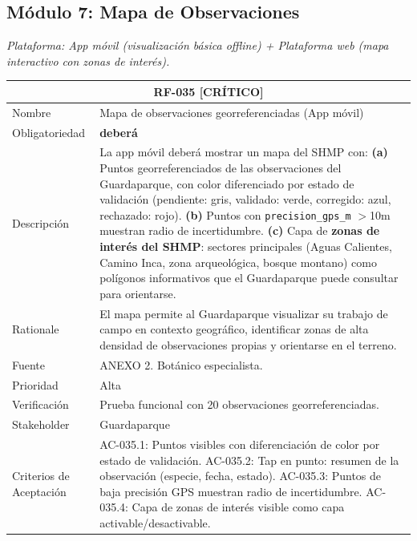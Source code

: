 \documentclass[12pt, a4paper]{article}
\newcommand{\criticomark}{\textcolor{criticolor}{\textbf{[CR\'ITICO]}}}
\begin{document}
\subsection{M\'odulo 7: Mapa de Observaciones}

\textit{Plataforma: App m\'ovil (visualizaci\'on b\'asica offline) + Plataforma web (mapa interactivo con zonas de inter\'es).}

\begin{longtable}{|p{3cm}|p{11.5cm}|}
\hline
\multicolumn{2}{|c|}{\textbf{RF-035} \criticomark} \\
\hline
Nombre & Mapa de observaciones georreferenciadas (App m\'ovil) \\
\hline
Obligatoriedad & \textbf{deber\'a} \\
\hline
Descripci\'on & La app m\'ovil deber\'a mostrar un mapa del SHMP con:\newline
\textbf{(a)} Puntos georreferenciados de las observaciones del Guardaparque, con color diferenciado por estado de validaci\'on (pendiente: gris, validado: verde, corregido: azul, rechazado: rojo).\newline
\textbf{(b)} Puntos con \texttt{precision\_gps\_m} $>$10m muestran radio de incertidumbre.\newline
\textbf{(c)} Capa de \textbf{zonas de inter\'es del SHMP}: sectores principales (Aguas Calientes, Camino Inca, zona arqueol\'ogica, bosque montano) como pol\'igonos informativos que el Guardaparque puede consultar para orientarse. \\
\hline
Rationale & El mapa permite al Guardaparque visualizar su trabajo de campo en contexto geogr\'afico, identificar zonas de alta densidad de observaciones propias y orientarse en el terreno. \\
\hline
Fuente & ANEXO 2. Bot\'anico especialista. \\
\hline
Prioridad & Alta \\
\hline
Verificaci\'on & Prueba funcional con 20 observaciones georreferenciadas. \\
\hline
Stakeholder & Guardaparque \\
\hline
Criterios de Aceptaci\'on &
AC-035.1: Puntos visibles con diferenciaci\'on de color por estado de validaci\'on. \newline
AC-035.2: Tap en punto: resumen de la observaci\'on (especie, fecha, estado). \newline
AC-035.3: Puntos de baja precisi\'on GPS muestran radio de incertidumbre. \newline
AC-035.4: Capa de zonas de inter\'es visible como capa activable/desactivable. \\
\hline
\end{longtable}
\end{document}
